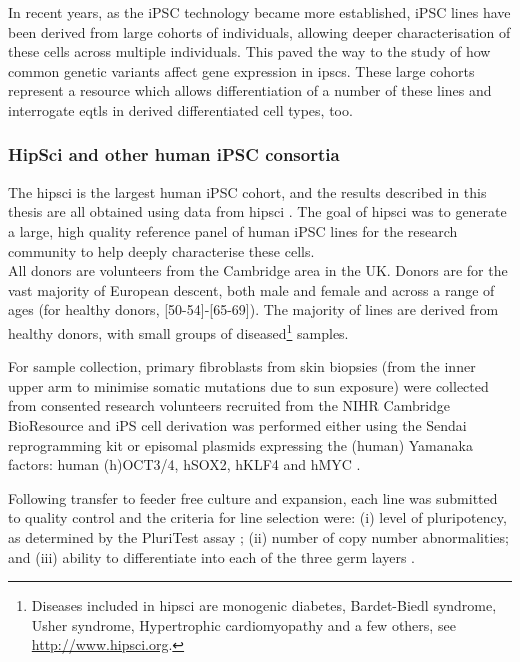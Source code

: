 In recent years, as the iPSC technology became more established, iPSC lines have been derived from large cohorts of individuals, allowing deeper characterisation of these cells across multiple individuals.
This paved the way to the study of how common genetic variants affect gene expression in \glspl{ipsc}.
These large cohorts represent a resource which allows differentiation of a number of these lines and interrogate \glspl{eqtl} in derived differentiated cell types, too.

\subsubsection{HipSci and other human iPSC consortia}

The \gls{hipsci} is the largest human iPSC cohort, and the results described in this thesis are all obtained using data from \gls{hipsci} \cite{kilpinen2017common}.
The goal of \gls{hipsci} was to generate a large, high quality reference panel of human iPSC lines for the research community to help deeply characterise these cells. \\

All donors are volunteers from the Cambridge area in the UK. 
Donors are for the vast majority of European descent, both male and female and across a range of ages (for healthy donors, [50-54]-[65-69]).
The majority of lines are derived from healthy donors, with small groups of diseased\footnote{Diseases included in \gls{hipsci} are monogenic diabetes, Bardet-Biedl syndrome, Usher syndrome, Hypertrophic cardiomyopathy and a few others, see \url{http://www.hipsci.org}.} samples.

For sample collection, primary fibroblasts from skin biopsies (from the inner upper arm to minimise somatic mutations due to sun exposure) were collected from consented research volunteers recruited from the NIHR Cambridge BioResource and iPS cell derivation was performed either using the Sendai reprogramming kit or episomal plasmids expressing the (human) Yamanaka factors: human (h)OCT3/4, hSOX2, hKLF4 and hMYC \cite{yu2009human}.

Following transfer to feeder free culture and expansion, each line was submitted to quality control and the criteria for line selection were: (i) level of pluripotency, as determined by the PluriTest assay \cite{muller2011bioinformatic}; (ii) number of copy number abnormalities; and (iii) ability to differentiate into each of the three germ layers \cite{kilpinen2017common}. \\

